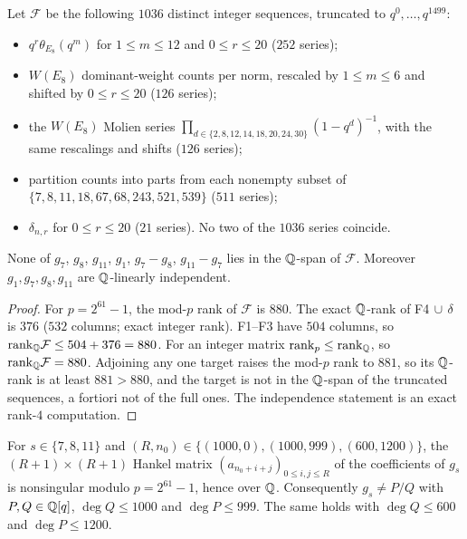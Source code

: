 \begin{proposition}\label{prop:N3}
Let $\mathcal F$ be the following $1036$ distinct integer sequences, truncated to $q^0,\dots,q^{1499}$:
\begin{itemize}
\item[F1] $q^r\theta_{E_8}(q^m)$ for $1\le m\le12$ and $0\le r\le20$ ($252$ series);
\item[F2] $W(E_8)$ dominant-weight counts per norm, rescaled by $1\le m\le6$ and shifted by $0\le r\le20$ ($126$ series);
\item[F3] the $W(E_8)$ Molien series $\prod_{d\in\{2,8,12,14,18,20,24,30\}}(1-q^d)^{-1}$, with the same rescalings and shifts ($126$ series);
\item[F4] partition counts into parts from each nonempty subset of $\{7,8,11,18,67,68,243,521,539\}$ ($511$ series);
\item[$\delta$] $\delta_{n,r}$ for $0\le r\le20$ ($21$ series). No two of the $1036$ series coincide.
\end{itemize}
None of $g_7$, $g_8$, $g_{11}$, $g_1$, $g_7-g_8$, $g_{11}-g_7$ lies in the $\mathbb{Q}$-span of $\mathcal F$. Moreover $g_1,g_7,g_8,g_{11}$ are $\mathbb{Q}$-linearly independent.
\end{proposition}
\begin{proof}
For $p=2^{61}-1$, the mod-$p$ rank of $\mathcal F$ is $880$. The exact $\mathbb{Q}$-rank of F4$\,\cup\,\delta$ is $376$ ($532$ columns; exact integer rank). F1--F3 have $504$ columns, so $\mathrm{rank}_{\mathbb{Q}}\mathcal F\le504+376=880$. For an integer matrix $\mathrm{rank}_p\le\mathrm{rank}_{\mathbb{Q}}$, so $\mathrm{rank}_{\mathbb{Q}}\mathcal F=880$. Adjoining any one target raises the mod-$p$ rank to $881$, so its $\mathbb{Q}$-rank is at least $881>880$, and the target is not in the $\mathbb{Q}$-span of the truncated sequences, a fortiori not of the full ones. The independence statement is an exact rank-$4$ computation.
\end{proof}
\begin{proposition}\label{prop:N4}
For $s\in\{7,8,11\}$ and $(R,n_0)\in\{(1000,0),(1000,999),(600,1200)\}$, the $(R+1)\times(R+1)$ Hankel matrix $(a_{n_0+i+j})_{0\le i,j\le R}$ of the coefficients of $g_s$ is nonsingular modulo $p=2^{61}-1$, hence over $\mathbb{Q}$. Consequently $g_s\neq P/Q$ with $P,Q\in\mathbb{Q}[q]$, $\deg Q\le1000$ and $\deg P\le999$. The same holds with $\deg Q\le600$ and $\deg P\le1200$.
\end{proposition}
